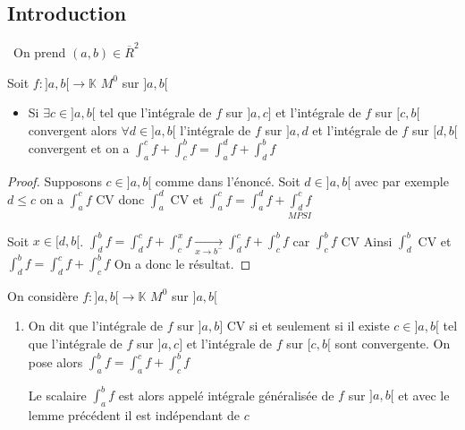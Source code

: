 \documentclass[11pt,hidelinks]{book}
\theoremstyle{mytheoremstyle}
\theoremstyle{mytheoremstyle}
\theoremstyle{mytheoremstyle}
\theoremstyle{mytheoremstyle}
\theoremstyle{mytheoremstyle}
\theoremstyle{mytheoremstyle}
\theoremstyle{mytheoremstyle}
\theoremstyle{mytheoremstyle}
\theoremstyle{myproblemstyle}
\def\mbb#1{\mathbb{#1}}
\def\ib#1{\int_{a}^{b} #1}
\def\bK{\mbb{K}}
\def\abc{]a,b]}
\def\abd{]a,b[}
\newcommand{\func}[3]{#1\colon#2\to#3}
\begin{document}
    \subsection{Introduction} On prend $(a,b) \in \overline{R}^2$
    \begin{adjustwidth}{-2em}{-1em}
        \begin{theorem}[Lemme]
            Soit $\func{f}{\abd}{\bK}$ $M^0$ sur $\abd$ 
            \begin{itemize} 
            \item Si $\exists c \in \abd$ tel que l'intégrale de $f$ sur $]a,c]$ et l'intégrale de $f$ sur 
            $[c,b[$ convergent alors $\forall d \in \abd$ l'intégrale de $f$ sur $]a,d$ et l'intégrale 
            de $f$ sur $[d,b[$ convergent et on a $\int_{a}^{c} f + \int_{c}^{b} f = \int_{a}^{d} f + \int_{d}^{b} f$
            \end{itemize}
            \begin{proof}
                Supposons $c \in \abd$ comme dans l'énoncé. 
                Soit $d \in \abd$ avec par exemple $d \leq c$ 
                on a $\int_{a}^{c} f$ CV donc $\int_{a}^{d}$ CV et $\int_{a}^{c} f = \int_{a}^{d} f + \underset{MPSI}{\int_{d}^{c} f}$
                 
                
                Soit $x \in [d,b[$. 
                $\int_{d}^{b} f = \int_{d}^{c} f + \int_{c}^{x} f \xrightarrow[x \to b^-]{} \int_{d}^{c} f + \int_{c}^{b} f$ car $\int_{c}^{b} f$ CV
                Ainsi $\int_{d}^{b}$ CV et $\int_{d}^{b} f = \int_{d}^{c} f + \int_{c}^{b} f$
                On a donc le résultat.
            \end{proof}
        \end{theorem}      
        \begin{definition}
            On considère $\func{f}{\abd}{\bK}$ $M^0$ sur $\abd$
            \begin{enumerate}
            \item On dit que l'intégrale de $f$ sur $\abc$ CV si et seulement si 
            il existe $c \in \abd$ tel que l'intégrale de $f$ sur $]a,c]$ et l'intégrale de 
            $f$ sur $[c,b[$ sont convergente. On pose alors $\ib{f} = \int_{a}^{c} f + \int_{c}^{b} f$
            
            \begin{rmq}
            Le scalaire $\ib{f}$ est alors appelé intégrale généralisée de $f$ sur $\abd$ 
            et avec le lemme précédent il est indépendant de $c$  
            \end{rmq}


\end{enumerate}
\end{definition}
\end{adjustwidth}
\end{document}
